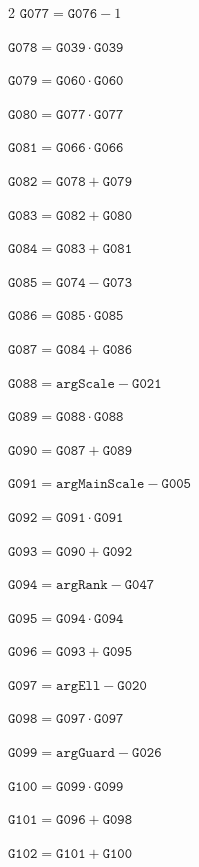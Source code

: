 \documentclass[10pt]{article}
\begin{document}
\begin{multicols}{2}
\noindent $\mathtt{G077}=\mathtt{G076}-1$\par
\noindent $\mathtt{G078}=\mathtt{G039}\cdot \mathtt{G039}$\par
\noindent $\mathtt{G079}=\mathtt{G060}\cdot \mathtt{G060}$\par
\noindent $\mathtt{G080}=\mathtt{G077}\cdot \mathtt{G077}$\par
\noindent $\mathtt{G081}=\mathtt{G066}\cdot \mathtt{G066}$\par
\noindent $\mathtt{G082}=\mathtt{G078}+\mathtt{G079}$\par
\noindent $\mathtt{G083}=\mathtt{G082}+\mathtt{G080}$\par
\noindent $\mathtt{G084}=\mathtt{G083}+\mathtt{G081}$\par
\noindent $\mathtt{G085}=\mathtt{G074}-\mathtt{G073}$\par
\noindent $\mathtt{G086}=\mathtt{G085}\cdot \mathtt{G085}$\par
\noindent $\mathtt{G087}=\mathtt{G084}+\mathtt{G086}$\par
\noindent $\mathtt{G088}=\mathtt{argScale}-\mathtt{G021}$\par
\noindent $\mathtt{G089}=\mathtt{G088}\cdot \mathtt{G088}$\par
\noindent $\mathtt{G090}=\mathtt{G087}+\mathtt{G089}$\par
\noindent $\mathtt{G091}=\mathtt{argMainScale}-\mathtt{G005}$\par
\noindent $\mathtt{G092}=\mathtt{G091}\cdot \mathtt{G091}$\par
\noindent $\mathtt{G093}=\mathtt{G090}+\mathtt{G092}$\par
\noindent $\mathtt{G094}=\mathtt{argRank}-\mathtt{G047}$\par
\noindent $\mathtt{G095}=\mathtt{G094}\cdot \mathtt{G094}$\par
\noindent $\mathtt{G096}=\mathtt{G093}+\mathtt{G095}$\par
\noindent $\mathtt{G097}=\mathtt{argEll}-\mathtt{G020}$\par
\noindent $\mathtt{G098}=\mathtt{G097}\cdot \mathtt{G097}$\par
\noindent $\mathtt{G099}=\mathtt{argGuard}-\mathtt{G026}$\par
\noindent $\mathtt{G100}=\mathtt{G099}\cdot \mathtt{G099}$\par
\noindent $\mathtt{G101}=\mathtt{G096}+\mathtt{G098}$\par
\noindent $\mathtt{G102}=\mathtt{G101}+\mathtt{G100}$\par

\end{multicols}
\end{document}
